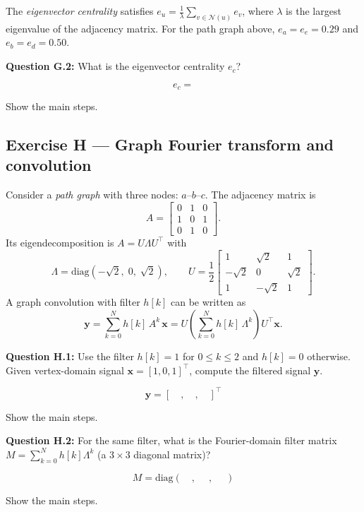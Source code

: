 \documentclass[12pt,a4paper]{article}
\begin{document}
The \emph{eigenvector centrality} satisfies $e_u = \tfrac{1}{\lambda}\sum_{v\in\mathcal{N}(u)}e_v$,
where $\lambda$ is the largest eigenvalue of the adjacency matrix.  For the path graph above,
$e_a=e_e=0.29$ and $e_b=e_d=0.50$.

\textbf{Question G.2:} What is the eigenvector centrality $e_c$?

\[
  e_c =
\]

Show the main steps.

\vspace{4cm}

\newpage
\subsection*{Exercise H --- Graph Fourier transform and convolution}

Consider a \emph{path graph} with three nodes: $a$--$b$--$c$.  The adjacency matrix is
\[
  A = \begin{bmatrix}0&1&0\\1&0&1\\0&1&0\end{bmatrix}.
\]
Its eigendecomposition is $A=U\Lambda U^\top$ with
\[
  \Lambda = \mathrm{diag}(-\sqrt{2},\; 0,\; \sqrt{2}),\qquad
  U = \frac{1}{2}\begin{bmatrix}1&\sqrt{2}&1\\-\sqrt{2}&0&\sqrt{2}\\1&-\sqrt{2}&1\end{bmatrix}.
\]
A graph convolution with filter $h[k]$ can be written as
\[
  \mathbf{y} = \sum_{k=0}^N h[k]\,A^k\,\mathbf{x} = U\!\left(\sum_{k=0}^N h[k]\,\Lambda^k\right)\!U^\top\mathbf{x}. \tag{10}
\]

\textbf{Question H.1:} Use the filter $h[k]=1$ for $0\leq k\leq 2$ and $h[k]=0$ otherwise.
Given vertex-domain signal $\mathbf{x}=[1,0,1]^\top$, compute the filtered signal $\mathbf{y}$.

\[
  \mathbf{y} = [\phantom{00},\phantom{00},\phantom{00}]^\top
\]

Show the main steps.

\vspace{4cm}

\textbf{Question H.2:} For the same filter, what is the Fourier-domain filter matrix
$M=\sum_{k=0}^N h[k]\Lambda^k$ (a $3\times 3$ diagonal matrix)?

\[
  M = \mathrm{diag}(\phantom{00},\;\phantom{00},\;\phantom{00})
\]

Show the main steps.
\end{document}
